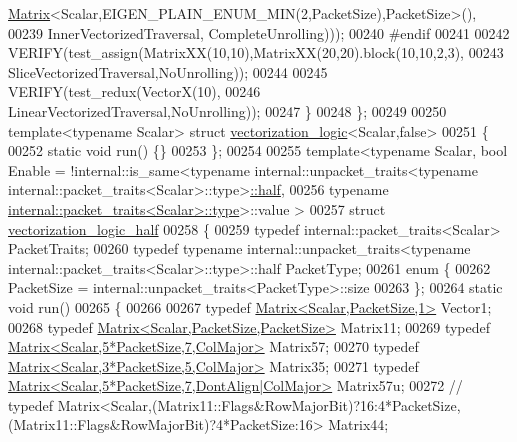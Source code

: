 \begin{DoxyCode}
      \hyperlink{group___core___module_class_eigen_1_1_matrix}{Matrix}<Scalar,EIGEN\_PLAIN\_ENUM\_MIN(2,PacketSize),PacketSize>(),
00239                         InnerVectorizedTraversal, CompleteUnrolling)));
00240 \textcolor{preprocessor}{    #endif}
00241 
00242     VERIFY(test\_assign(MatrixXX(10,10),MatrixXX(20,20).block(10,10,2,3),
00243       SliceVectorizedTraversal,NoUnrolling));
00244 
00245     VERIFY(test\_redux(VectorX(10),
00246       LinearVectorizedTraversal,NoUnrolling));
00247   \}
00248 \};
00249 
00250 \textcolor{keyword}{template}<\textcolor{keyword}{typename} Scalar> \textcolor{keyword}{struct }\hyperlink{structvectorization__logic}{vectorization\_logic}<Scalar,false>
00251 \{
00252   \textcolor{keyword}{static} \textcolor{keywordtype}{void} run() \{\}
00253 \};
00254 
00255 template<typename Scalar, bool Enable = !internal::is\_same<typename internal::unpacket\_traits<typename
       internal::packet\_traits<Scalar>::type>\hyperlink{struct_eigen_1_1half}{::half},
00256                                                            \textcolor{keyword}{typename} 
      \hyperlink{group___sparse_core___module}{internal::packet\_traits<Scalar>::type}>::value >
00257 \textcolor{keyword}{struct }\hyperlink{structvectorization__logic__half}{vectorization\_logic\_half}
00258 \{
00259   \textcolor{keyword}{typedef} internal::packet\_traits<Scalar> PacketTraits;
00260   \textcolor{keyword}{typedef} \textcolor{keyword}{typename} internal::unpacket\_traits<typename internal::packet\_traits<Scalar>::type>::half 
      PacketType;
00261   \textcolor{keyword}{enum} \{
00262     PacketSize = internal::unpacket\_traits<PacketType>::size
00263   \};
00264   \textcolor{keyword}{static} \textcolor{keywordtype}{void} run()
00265   \{
00266     
00267     \textcolor{keyword}{typedef} \hyperlink{group___core___module_class_eigen_1_1_matrix}{Matrix<Scalar,PacketSize,1>} Vector1;
00268     \textcolor{keyword}{typedef} \hyperlink{group___core___module_class_eigen_1_1_matrix}{Matrix<Scalar,PacketSize,PacketSize>} Matrix11;
00269     \textcolor{keyword}{typedef} \hyperlink{group___core___module_class_eigen_1_1_matrix}{Matrix<Scalar,5*PacketSize,7,ColMajor>} Matrix57;
00270     \textcolor{keyword}{typedef} \hyperlink{group___core___module_class_eigen_1_1_matrix}{Matrix<Scalar,3*PacketSize,5,ColMajor>} Matrix35;
00271     \textcolor{keyword}{typedef} \hyperlink{group___core___module_class_eigen_1_1_matrix}{Matrix<Scalar,5*PacketSize,7,DontAlign|ColMajor>}
       Matrix57u;
00272 \textcolor{comment}{//     typedef
       Matrix<Scalar,(Matrix11::Flags&RowMajorBit)?16:4*PacketSize,(Matrix11::Flags&RowMajorBit)?4*PacketSize:16> Matrix44;}

\end{DoxyCode}
